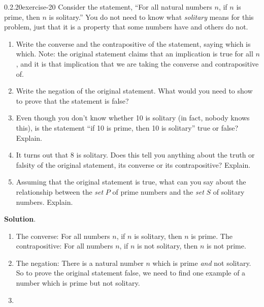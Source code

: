 \documentclass[twoside,11pt,]{book}
\numberwithin{equation}{chapter}
\begin{document}
\begin{divisionsolution}{0.2.20}{}{exercise-20}%
\hypertarget{p-399}{}%
Consider the statement, ``For all natural numbers \(n\), if \(n\) is prime, then \(n\) is solitary.'' You do not need to know what \emph{solitary} means for this problem, just that it is a property that some numbers have and others do not.\leavevmode%
\begin{enumerate}[label=(\alph*)]
\item\hypertarget{li-433}{}\hypertarget{p-400}{}%
Write the converse and the contrapositive of the statement, saying which is which. Note: the original statement claims that an implication is true for all \(n\), and it is that implication that we are taking the converse and contrapositive of.%
\item\hypertarget{li-434}{}\hypertarget{p-401}{}%
Write the negation of the original statement. What would you need to show to prove that the statement is false?%
\item\hypertarget{li-435}{}\hypertarget{p-402}{}%
Even though you don't know whether 10 is solitary (in fact, nobody knows this), is the statement ``if 10 is prime, then 10 is solitary'' true or false? Explain.%
\item\hypertarget{li-436}{}\hypertarget{p-403}{}%
It turns out that 8 is solitary. Does this tell you anything about the truth or falsity of the original statement, its converse or its contrapositive? Explain.%
\item\hypertarget{li-437}{}\hypertarget{p-404}{}%
Assuming that the original statement is true, what can you say about the relationship between the \emph{set} \(P\) of prime numbers and the \emph{set} \(S\) of solitary numbers. Explain.%
\end{enumerate}
%
\par\smallskip%
\noindent\textbf{Solution}.\quad%
\hypertarget{p-405}{}%
\leavevmode%
\begin{enumerate}[label=(\alph*)]
\item\hypertarget{li-438}{}\hypertarget{p-406}{}%
The converse: For all numbers \(n\), if \(n\) is solitary, then \(n\) is prime. The contrapositive: For all numbers \(n\), if \(n\) is not solitary, then \(n\) is not prime.%
\item\hypertarget{li-439}{}\hypertarget{p-407}{}%
The negation: There is a natural number \(n\) which is prime \emph{and} not solitary. So to prove the original statement false, we need to find one example of a number which is prime but not solitary.%
\item\hypertarget{li-440}{}\hypertarget{p-408}{}%

\end{enumerate}
\end{divisionsolution}
\end{document}
